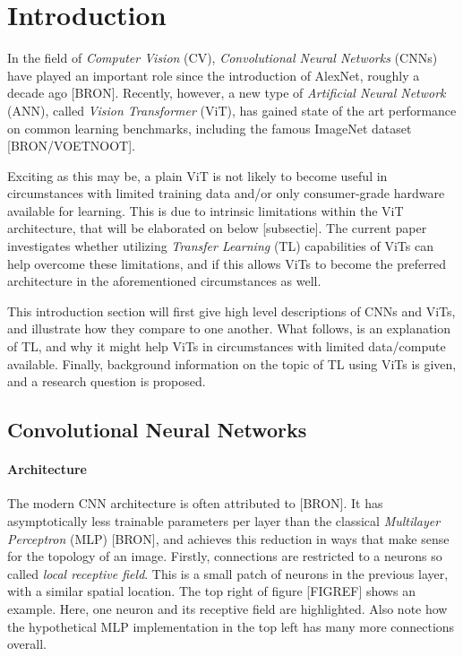 \section{Introduction}
In the field of \textit{Computer Vision} (CV), \textit{Convolutional Neural Networks} (CNNs) have played an important role since the introduction of AlexNet, roughly a decade ago [BRON]. Recently, however, a new type of \textit{Artificial Neural Network} (ANN), called \textit{Vision Transformer} (ViT), has gained state of the art performance on common learning benchmarks, including the famous ImageNet dataset [BRON/VOETNOOT].

Exciting as this may be, a plain ViT is not likely to become useful in circumstances with limited training data and/or only consumer-grade hardware available for learning. This is due to intrinsic limitations within the ViT architecture, that will be elaborated on below [subsectie]. The current paper investigates whether utilizing \textit{Transfer Learning} (TL) capabilities of ViTs can help overcome these limitations, and if this allows ViTs to become the preferred architecture in the aforementioned circumstances as well.

This introduction section will first give high level descriptions of CNNs and ViTs, and illustrate how they compare to one another. What follows, is an explanation of TL, and why it might help ViTs in circumstances with limited data/compute available. Finally, background information on the topic of TL using ViTs is given, and a research question is proposed.

\subsection{Convolutional Neural Networks}
\paragraph{Architecture}
The modern CNN architecture is often attributed to [BRON]. It has asymptotically less trainable parameters per layer than the classical \textit{Multilayer Perceptron} (MLP) [BRON], and achieves this reduction in ways that make sense for the topology of an image. Firstly, connections are restricted to a neurons so called \textit{local receptive field}. This is a small patch of neurons in the previous layer, with a similar spatial location. The top right of figure [FIGREF] shows an example. Here, one neuron and its receptive field are highlighted. Also note how the hypothetical MLP implementation in the top left has many more connections overall.

